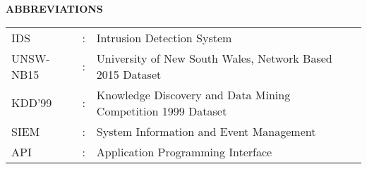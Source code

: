 \begin{center}
\large{\textbf{ABBREVIATIONS}}\\
\vspace{1cm}
\end{center}

\begin{table}[bpht!]
\centering
	\begin{tabular}{lcl}
	IDS&:& Intrusion Detection System\\
    UNSW-NB15&:& University of New South Wales, Network Based 2015 Dataset\\
    KDD'99&:& Knowledge Discovery and Data Mining Competition 1999 Dataset\\
    SIEM&:& System Information and Event Management\\
	API&:&Application Programming Interface
	\end{tabular}
\end{table}
